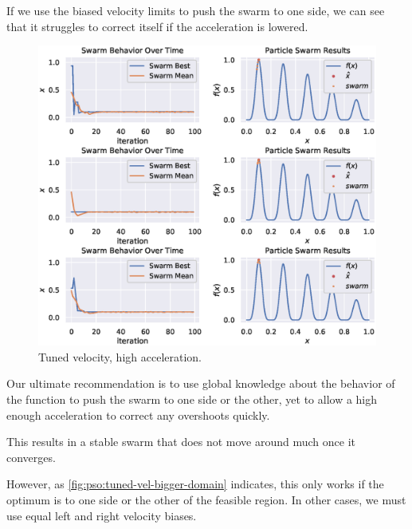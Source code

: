 \documentclass[12pt]{article}
\begin{document}
If we use the biased velocity limits to push the swarm to one side, we can see that it struggles to correct itself if the acceleration is lowered.

\begin{figure}[H]
    \centering
    \includegraphics[width=\textwidth]{figures/pso-tuned-vel-high-accel.eps}
    \caption{Tuned velocity, high acceleration.}\label{fig:pso:tuned-vel-high-accel}
\end{figure}

Our ultimate recommendation is to use global knowledge about the behavior of the function to push the swarm to one side or the other, yet to allow a high enough acceleration to correct any overshoots quickly.

This results in a stable swarm that does not move around much once it converges.

However, as \autoref{fig:pso:tuned-vel-bigger-domain} indicates, this only works if the optimum is to one side or the other of the feasible region.
In other cases, we must use equal left and right velocity biases.
\end{document}
